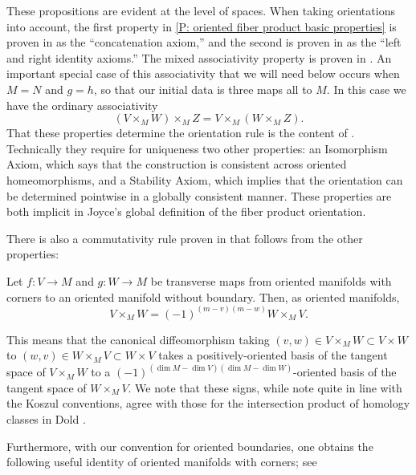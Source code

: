 These propositions are evident at the level of spaces.
When taking orientations into account, the first property in \cref{P: oriented fiber product basic properties} is proven in \cite[Sections 9.3.9]{RamBas09} as the ``concatenation axiom,'' and the second is proven in \cite[Sections 9.3.5 and 9.3.6]{RamBas09} as the ``left and right identity axioms.''
The mixed associativity property is proven in \cite[Sections 9.3.7]{RamBas09}.
An important special case of this associativity that we will need below occurs when $M=N$ and $g=h$, so that our initial data is three maps all to $M$.
In this case we have the ordinary associativity
\begin{equation}\label{E: oriented fiber associativity}
	(V\times_MW)\times_M Z=V\times_M(W\times_M Z).
\end{equation}
That these properties determine the orientation rule is the content of \cite[Theorem 9-10]{RamBas09}.
Technically they require for uniqueness two other properties: an Isomorphism Axiom, which says that the construction is consistent across oriented homeomorphisms, and a Stability Axiom, which implies that the orientation can be determined pointwise in a globally consistent manner.
These properties are both implicit in Joyce's global definition of the fiber product orientation.

There is also a commutativity rule proven in \cite[Sections 9.3.8]{RamBas09} that follows from the other properties:

\begin{proposition}\label{P: commute oriented fiber}
	Let $f:V\to M$ and $g:W\to M$ be transverse maps from oriented manifolds with corners to an oriented manifold without boundary.
	Then, as oriented manifolds,
	\begin{equation*}
		V\times_M W=(-1)^{(m-v)(m-w)}W\times_M V.
	\end{equation*}
\end{proposition}

This means that the canonical diffeomorphism taking $(v,w)\in V\times_MW\subset V\times W$ to $(w,v)\in W\times_MV\subset W\times V$ takes a positively-oriented basis of the tangent space of $V\times_MW$ to a $(-1)^{(\dim M-\dim V)(\dim M-\dim W)}$-oriented basis of the tangent space of $W\times_MV$.
We note that these signs, while note quite in line with the Koszul conventions, agree with those for the intersection product of homology classes in Dold \cite[Section VIII.13]{Dol72}.

Furthermore, with our convention for oriented boundaries, one obtains the following useful identity of oriented manifolds with corners; see \cite[Propositions 7.4 and 7.5]{Joy12}

